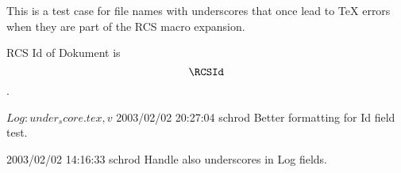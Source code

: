 \documentclass{article}
\begin{document}
This is a test case for file names with underscores that once lead to
\TeX{} errors when they are part of the RCS macro expansion.

RCS Id of Dokument is $$\hbox{\texttt{\RCSId}}$$.

\begin{rcslog}
$Log: under_score.tex,v $
 2003/02/02 20:27:04 schrod
Better formatting for Id field test.

 2003/02/02 14:16:33 schrod
Handle also underscores in Log fields.

\end{rcslog}
\end{document}
